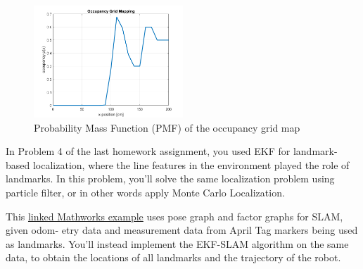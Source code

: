 \documentclass[answers]{exam}
\begin{document}
\begin{questions}
    \begin{solution}
        \begin{figure}[H] %
            \centering
            \includegraphics[width=0.5\textwidth]{Q2PMF.png} %
            \caption{Probability Mass Function (PMF) of the occupancy grid map}
            \label{fig:image1} %
        \end{figure}
    \end{solution}

    \question[25]
    In Problem 4 of the last homework assignment, you used EKF for landmark-based localization, where the line features in the environment played the role of landmarks. In this problem, you'll solve the same localization problem using particle filter, or in other words apply Monte Carlo Localization.

    \begin{solution}
    \end{solution}

    \question[(Bonus) 20]
    This \href{https://www.mathworks.com/help/nav/ug/landmark-slam-using-apriltag-markers.html}{linked Mathworks example} uses pose graph and factor graphs for SLAM, given odom-
    etry data and measurement data from April Tag markers being used as landmarks. You'll
    instead implement the EKF-SLAM algorithm on the same data, to obtain the locations of all
    landmarks and the trajectory of the robot.

    \begin{solution}
    \end{solution}
\end{questions}
\end{document}
